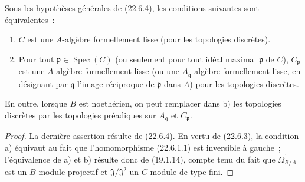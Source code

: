 \begin{corollary}[22.6.6]
\label{0.22.6.6-fr}
Sous les hypothèses générales de (22.6.4), les conditions suivantes sont
équivalentes~:
\begin{enumerate}
  \item[a)] $C$ est une $A$-algèbre formellement lisse (pour les topologies
  discrètes).
  \item[b)] Pour tout $\mathfrak p\in\operatorname{Spec}(C)$ (ou seulement pour tout idéal
  maximal $\mathfrak p$ de $C$), $C_{\mathfrak p}$ est une $A$-algèbre
  formellement lisse (ou une $A_{\mathfrak q}$-algèbre formellement lisse, en
  désignant par $\mathfrak q$ l'image réciproque de $\mathfrak p$ dans $A$)
  pour les topologies discrètes.
\end{enumerate}
En outre, lorsque $B$ est noethérien, on peut remplacer dans b) les topologies
discrètes par les topologies préadiques sur $A_{\mathfrak q}$ et
$C_{\mathfrak p}$.
\end{corollary}

\begin{proof}
La dernière assertion résulte de (22.6.4). En vertu de (22.6.3), la condition
a) équivaut au fait que l'homomorphisme (22.6.1.1) est inversible à gauche~;
l'équivalence de a) et b) résulte donc de (19.1.14), compte tenu du fait que
$\Omega^1_{B/A}$ est un $B$-module projectif et $\mathfrak J/\mathfrak J^2$
un $C$-module de type fini.
\end{proof}


